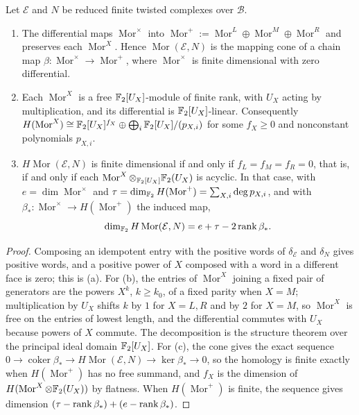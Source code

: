 \begin{lemma}\label{lem:wrapped-reduction}
Let $\mathcal E$ and $N$ be reduced finite twisted complexes over $\mathcal B$.
\begin{enumerate}
\item[(a)] The differential maps $\operatorname{Mor}^\times$ into
$\operatorname{Mor}^+:=\operatorname{Mor}^L\oplus\operatorname{Mor}^M\oplus\operatorname{Mor}^R$ and
preserves each $\operatorname{Mor}^X$.  Hence $\operatorname{Mor}(\mathcal E,N)$ is the mapping cone of
a chain map $\beta\colon\operatorname{Mor}^\times\to\operatorname{Mor}^+$, where
$\operatorname{Mor}^\times$ is finite dimensional with zero differential.
\item[(b)] Each $\operatorname{Mor}^X$ is a free $\mathbb{F}_2[U_X]$-module of finite rank, with $U_X$ acting by
multiplication, and its differential is $\mathbb{F}_2[U_X]$-linear.  Consequently
$H(\operatorname{Mor}^X)\cong\mathbb{F}_2[U_X]^{f_X}\oplus\bigoplus_i\mathbb{F}_2[U_X]/(p_{X,i})$ for some $f_X\ge0$
and nonconstant polynomials $p_{X,i}$.
\item[(c)] $H\operatorname{Mor}(\mathcal E,N)$ is finite dimensional if and only if $f_L=f_M=f_R=0$,
that is, if and only if each $\operatorname{Mor}^X\otimes_{\mathbb{F}_2[U_X]}\mathbb{F}_2(U_X)$ is acyclic.  In that
case, with $e=\dim\operatorname{Mor}^\times$ and $\tau=\dim_{\mathbb{F}_2}H(\operatorname{Mor}^+)=\sum_{X,i}\deg
p_{X,i}$, and with $\beta_*\colon\operatorname{Mor}^\times\to H(\operatorname{Mor}^+)$ the induced map,
\begin{equation}\label{eq:wrapped-reduction}
 \dim_{\mathbb{F}_2}H\operatorname{Mor}(\mathcal E,N)=e+\tau-2\operatorname{rank}\beta_*.
\end{equation}
\end{enumerate}
\end{lemma}

\begin{proof}
Composing an idempotent entry with the positive words of $\delta_{\mathcal E}$ and $\delta_N$ gives
positive words, and a positive power of $X$ composed with a word in a different face is zero; this is
(a).  For (b), the entries of $\operatorname{Mor}^X$ joining a fixed pair of generators are the powers
$X^k$, $k\ge k_0$, of a fixed parity when $X=M$; multiplication by $U_X$ shifts $k$ by $1$ for $X=L,R$
and by $2$ for $X=M$, so $\operatorname{Mor}^X$ is free on the entries of lowest length, and the
differential commutes with $U_X$ because powers of $X$ commute.  The decomposition is the structure
theorem over the principal ideal domain $\mathbb{F}_2[U_X]$.  For (c), the cone gives the exact sequence
$0\to\operatorname{coker}\beta_*\to H\operatorname{Mor}(\mathcal E,N)\to\ker\beta_*\to0$, so the
homology is finite exactly when $H(\operatorname{Mor}^+)$ has no free summand, and $f_X$ is the
dimension of $H(\operatorname{Mor}^X\otimes\mathbb{F}_2(U_X))$ by flatness.  When $H(\operatorname{Mor}^+)$ is
finite, the sequence gives dimension $(\tau-\operatorname{rank}\beta_*)+(e-\operatorname{rank}\beta_*)$.
\end{proof}

